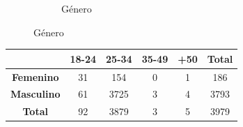 \documentclass{beamer}
\begin{document}
\begin{frame}
\begin{figure}[H]
\begin{subfigure}{0.3\textwidth}
			\caption{Género}
			\label{subfig:blm/resultados-genero-moda}
		\end{subfigure}
	\end{figure}
	\begin{table}[H]
		{
			\setlength{\tabcolsep}{0.6\tabcolsep}
			\begin{tabular}{|c|c|c|c|c|c|}
				\hline
				\diagbox{\textbf{Género}}{\textbf{Edad}} & \textbf{18-24} & \textbf{25-34} & \textbf{35-49} & \textbf{+50} & \textbf{Total} \\ \hline
				\textbf{Femenino} & 31 & 154 & 0 & 1 & 186 \\ \hline
				\textbf{Masculino} & 61 & 3725 & 3 & 4 & 3793 \\ \hline
				\textbf{Total} & 92 & 3879 & 3 & 5 & 3979 \\ \hline
				
			\end{tabular}%
		}
	\end{table}
\end{frame}
\end{document}
